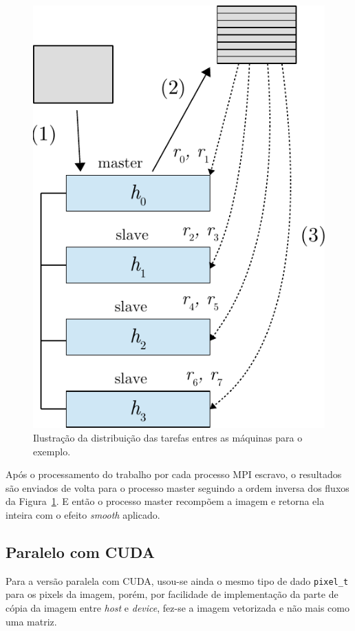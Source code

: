 \begin{figure}[h!]
	\centering
	\includegraphics[scale=.85]{./input/hosts.pdf}
	\caption{Ilustração da distribuição das tarefas entres as máquinas para o exemplo. \label{fig:hosts}}
\end{figure}

Após o processamento do trabalho por cada processo MPI escravo, o resultados são enviados de volta para o processo master seguindo a ordem inversa dos fluxos da Figura~\ref{fig:hosts}. E então o processo master recompõem a imagem e retorna ela inteira com o efeito \textit{smooth} aplicado.

\subsection{Paralelo com CUDA}

Para a versão paralela com CUDA, usou-se ainda o mesmo tipo de dado \texttt{pixel\_t} para os pixels da imagem, porém, por facilidade de implementação da parte de cópia da imagem entre \textit{host} e \textit{device}, fez-se a imagem vetorizada e não mais como uma matriz.


